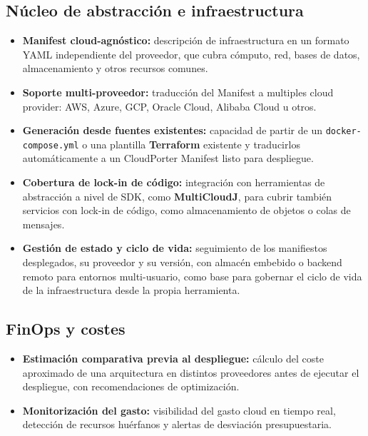 \subsection{Núcleo de abstracción e infraestructura}

\begin{itemize}
    \item \textbf{Manifest cloud-agnóstico:} descripción de infraestructura en un
    formato YAML independiente del proveedor, que cubra cómputo, red, bases de
    datos, almacenamiento y otros recursos comunes.
    
    \item \textbf{Soporte multi-proveedor:} traducción del Manifest a multiples
    cloud provider: AWS, Azure, GCP, Oracle Cloud, Alibaba Cloud u otros.

    \item \textbf{Generación desde fuentes existentes:} capacidad de partir de
    un \texttt{docker-compose.yml} o una plantilla \textbf{Terraform} existente y
    traducirlos automáticamente a un CloudPorter Manifest listo para despliegue.

    \item \textbf{Cobertura de lock-in de código:} integración con herramientas
    de abstracción a nivel de SDK, como \textbf{MultiCloudJ}, para cubrir
    también servicios con lock-in de código, como almacenamiento de objetos
    o colas de mensajes.

    \item \textbf{Gestión de estado y ciclo de vida:} seguimiento de los
    manifiestos desplegados, su proveedor y su versión, con almacén embebido o
    backend remoto para entornos multi-usuario, como base para gobernar el ciclo
    de vida de la infraestructura desde la propia herramienta.
\end{itemize}

\subsection{FinOps y costes}

\begin{itemize}
    \item \textbf{Estimación comparativa previa al despliegue:} cálculo del
    coste aproximado de una arquitectura en distintos proveedores antes de
    ejecutar el despliegue, con recomendaciones de optimización.

    \item \textbf{Monitorización del gasto:} visibilidad del gasto cloud en
    tiempo real, detección de recursos huérfanos y alertas de desviación
    presupuestaria.
\end{itemize}

